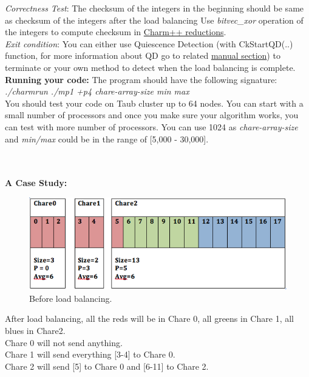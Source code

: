 \documentclass{article}
\begin{document}
\emph{Correctness Test}: The checksum of the integers in the beginning
should be same as checksum of the integers after the load balancing
Use \emph{bitvec\_xor} operation of the integers to compute checksum in  \href{http://charm.cs.uiuc.edu/manuals/html/charm++/4.html#SECTION01361000000000000000}{ Charm++
reductions}. \\

\emph{Exit condition}: You can either use Quiescence Detection (with CkStartQD(..) function, for more
information about QD go to related
\href{http://charm.cs.illinois.edu/manuals/html/charm++/12.html#SECTION02350000000000000000}{manual
section}) to terminate or your own method to detect when
the load balancing is complete. \\


\textbf{Running your code:}
The program should have the following signature: \\
\textit{./charmrun ./mp1 +p4 chare-array-size min max} \\

You should test your code on Taub cluster up to 64 nodes. You can start with a small
number of processors and once you make sure your algorithm works, you can test
with more number of processors. You can use 1024 as
\textit{chare-array-size} and \textit{min/max} could be in the range of [5,000 - 30,000].
\\ \\ \\

\pagebreak

\textbf{A Case Study:} 

\begin{figure}[h]
\centering
\includegraphics[width=\textwidth]{before_balance.png}
\caption{Before load balancing.}
\label{prefix}
\end{figure}

After load balancing, all the reds will be in Chare 0, all greens in Chare 1, all blues in Chare2. \\
Chare 0 will not send anything.\\
Chare 1 will send everything [3-4] to Chare 0.\\
Chare 2 will send [5] to Chare 0 and [6-11] to Chare 2.\\
\end{document}
